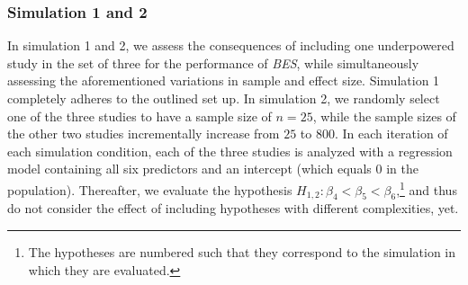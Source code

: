 \documentclass[review, 3p, authoryear]{elsarticle} %
\begin{document}
\begin{table}[t]
\centering
\caption{Population-level regression coefficients for ordinary least squares (OLS), logistic and probit regression, given effect sizes of $R^2 \in \{0.02, 0.09, 0.25\}$.} 
\label{tab:coefs}
\end{table}

\hypertarget{simulation-1-and-2}{%
\subsubsection{Simulation 1 and 2}\label{simulation-1-and-2}}

In simulation 1 and 2, we assess the consequences of including one underpowered study in the set of three for the performance of \emph{BES}, while simultaneously assessing the aforementioned variations in sample and effect size.
Simulation 1 completely adheres to the outlined set up.
In simulation 2, we randomly select one of the three studies to have a sample size of \(n = 25\), while the sample sizes of the other two studies incrementally increase from \(25\) to \(800\).
In each iteration of each simulation condition, each of the three studies is analyzed with a regression model containing all six predictors and an intercept (which equals 0 in the population).
Thereafter, we evaluate the hypothesis \(H_{1,2}: \beta_4 < \beta_5 < \beta_6\),\footnote{
  The hypotheses are numbered such that they correspond to the simulation in which they are evaluated.}
and thus do not consider the effect of including hypotheses with different complexities, yet.
\end{document}
